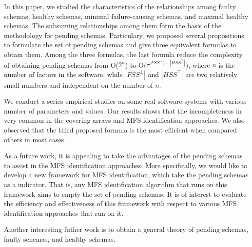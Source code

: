 {In this paper, we studied the characteristics of the relationships among faulty schemas, healthy schemas, minimal failure-causing schemas, and maximal healthy schemas. The subsuming relationships among them form the basis of the methodology for pending schemas. Particulary, we proposed several propositions to formulate the set of pending schemas and give three equivalent formulas to obtain them. Among the three formulas, the last formula reduce the complexity of obtaining pending schemas from O($2^{n}$) to O($ \tau^{|FSS^{\bot}|+|HSS^{\top}|}$), where $n$ is the number of factors in the software, while $|FSS^{\bot}|$ and $|HSS^{\top}|$ are two relatively small numbers and independent on the number of $n$.

We conduct a series empirical studies on some real software systems with various number of parameters and values. Our results shows that the incompleteness in very common in the covering arrays and MFS identification approaches. We also observed that the third proposed formula is the most efficient when compared others in most cases.

As a future work, it is appealing to take the advantages of the pending schemas to assist in the MFS identification approaches. More specifically, we would like to develop a new framework for MFS identification, which take the pending schemas as a indicator. That is, any MFS identification algorithm that runs on this framework aims to empty the set of pending schemas. It is of interest to evaluate the efficiency and effectiveness of this framework with respect to various MFS identification approaches that run on it.

Another interesting futher work is to obtain a general theory of pending schemas, faulty schemas, and healthy schemas.

\appendix
%
%
%
%
%
%
%
%
%
%
%
%
%
%
%



}
